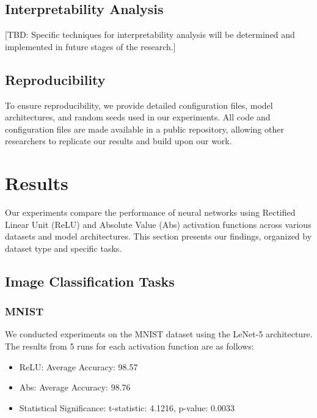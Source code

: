 \documentclass[11pt]{article}
\begin{document}
\subsection{Interpretability Analysis}

[TBD: Specific techniques for interpretability analysis will be determined and implemented in future stages of the research.]

\subsection{Reproducibility}

To ensure reproducibility, we provide detailed configuration files, model architectures, and random seeds used in our experiments. All code and configuration files are made available in a public repository, allowing other researchers to replicate our results and build upon our work.

\section{Results}

Our experiments compare the performance of neural networks using Rectified Linear Unit (ReLU) and Absolute Value (Abs) activation functions across various datasets and model architectures. This section presents our findings, organized by dataset type and specific tasks.

\subsection{Image Classification Tasks}

\subsubsection{MNIST}

We conducted experiments on the MNIST dataset using the LeNet-5 architecture. The results from 5 runs for each activation function are as follows:

\begin{itemize}
\item ReLU: Average Accuracy: 98.57%
\item Abs: Average Accuracy: 98.76%
\item Statistical Significance: t-statistic: 4.1216, p-value: 0.0033
\end{itemize}
\end{document}
